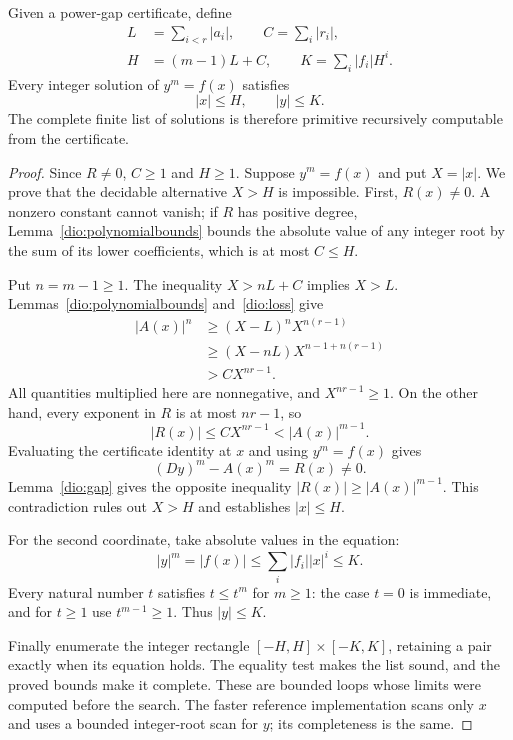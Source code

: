 \begin{theorem}
\label{dio:height}
Given a power-gap certificate, define
\[
 \begin{split}
 L&=\sum_{i<r}|a_i|,\qquad C=\sum_i|r_i|,\\
 H&=(m-1)L+C,\qquad K=\sum_i|f_i|H^i.
 \end{split}
\]
Every integer solution of $y^m=f(x)$ satisfies
\[
                         |x|\leq H,\qquad |y|\leq K.
\]
The complete finite list of solutions is therefore primitive recursively
computable from the certificate.
\end{theorem}
\begin{proof}
Since $R\ne0$, $C\geq1$ and $H\geq1$.  Suppose $y^m=f(x)$ and put
$X=|x|$.  We prove that the decidable alternative $X>H$ is impossible.
First, $R(x)\ne0$.  A nonzero constant cannot vanish; if $R$ has positive
degree, Lemma~\ref{dio:polynomialbounds} bounds the absolute value of any
integer root by the sum of its lower coefficients, which is at most
$C\leq H$.

Put $n=m-1\geq1$.  The inequality $X>nL+C$ implies $X>L$.
Lemmas~\ref{dio:polynomialbounds} and~\ref{dio:loss} give
\begin{align*}
 |A(x)|^n
 &\geq (X-L)^n X^{n(r-1)}\\
 &\geq (X-nL)X^{n-1+n(r-1)}\\
 &> C X^{nr-1}.
\end{align*}
All quantities multiplied here are nonnegative, and $X^{nr-1}\geq1$.
On the other hand, every exponent in $R$ is at most $nr-1$, so
\[
                     |R(x)|\leq C X^{nr-1}<|A(x)|^{m-1}.
\]
Evaluating the certificate identity at $x$ and using $y^m=f(x)$ gives
\[
                    (Dy)^m-A(x)^m=R(x)\ne0.
\]
Lemma~\ref{dio:gap} gives the opposite inequality
$|R(x)|\geq|A(x)|^{m-1}$.  This contradiction rules out $X>H$ and
establishes $|x|\leq H$.

For the second coordinate, take absolute values in the equation:
\[
 |y|^m=|f(x)|\leq\sum_i|f_i||x|^i\leq K.
\]
Every natural number $t$ satisfies $t\leq t^m$ for $m\geq1$: the
case $t=0$ is immediate, and for $t\geq1$ use $t^{m-1}\geq1$.
Thus $|y|\leq K$.

Finally enumerate the integer rectangle
$[-H,H]\times[-K,K]$, retaining a pair exactly when its equation holds.
The equality test makes the list sound, and the proved bounds make it
complete.  These are bounded loops whose limits were computed before
the search.  The faster reference implementation scans only $x$ and
uses a bounded integer-root scan for $y$; its completeness is the same.
\end{proof}


